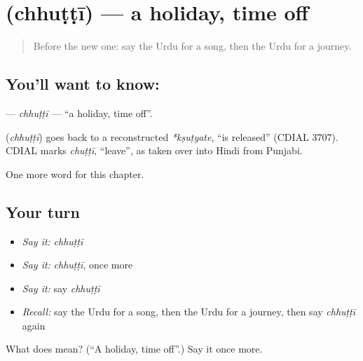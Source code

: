 \section[\texorpdfstring{\ur{چھٹی} (chhuṭṭī)}{چھٹی (chhuṭṭī)}]{ (chhuṭṭī) — a holiday, time off}

\label{lesson:UR-C87-chhutti}



\begin{quote}
Before the new one: say the Urdu for a song, then the Urdu for a journey.
\end{quote}

\subsection*{You'll want to know: }
\textbf{} — \emph{chhuṭṭī} — \textquotedblleft{}a holiday, time off\textquotedblright{}.

\begin{cousinweb}
\textbf{} (\emph{chhuṭṭī}) goes back to a reconstructed \emph{*kṣuṭyate}, \textquotedblleft{}is released\textquotedblright{} (CDIAL 3707). CDIAL marks \emph{chuṭṭī}, \textquotedblleft{}leave\textquotedblright{}, as taken over into Hindi from Punjabi.
\end{cousinweb}

\begin{grammarlens}[title={What you've built}]
One more word for this chapter.
\end{grammarlens}

\subsection*{Your turn}
\begin{itemize}
\raggedright
  \item \emph{Say it:} \emph{chhuṭṭī}
  \item \emph{Say it:} \emph{chhuṭṭī}, once more
  \item \emph{Say it:} say \emph{chhuṭṭī}
  \item \emph{Recall:} say the Urdu for a song, then the Urdu for a journey, then say \emph{chhuṭṭī} again
\end{itemize}

\begin{tcolorbox}[breakable,colback=teal!4,colframe=teal!35!black,title={Before you move on}]
What does  mean? (\textquotedblleft{}A holiday, time off\textquotedblright{}.) Say it once more.
\end{tcolorbox}
